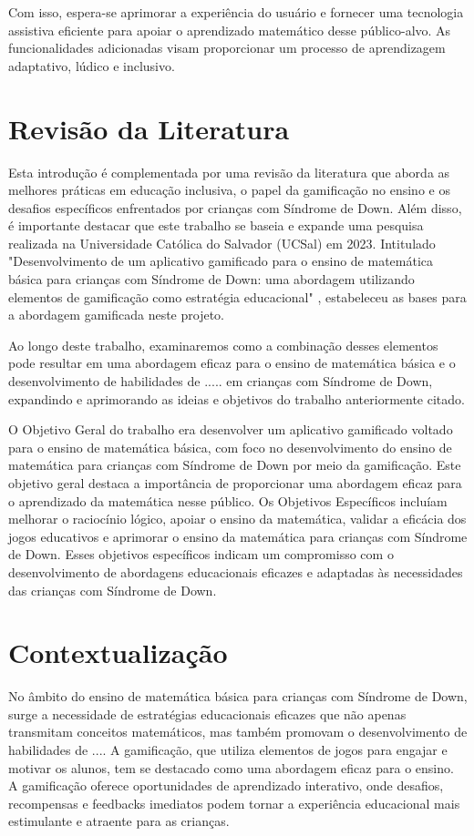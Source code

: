 Com isso, espera-se aprimorar a experiência do usuário e fornecer uma tecnologia assistiva eficiente para apoiar o aprendizado matemático desse público-alvo. As funcionalidades adicionadas visam proporcionar um processo de aprendizagem adaptativo, lúdico e inclusivo.

\section{Revisão da Literatura}

Esta introdução é complementada por uma revisão da literatura que aborda as melhores práticas em educação inclusiva, o papel da gamificação no ensino e os desafios específicos enfrentados por crianças com Síndrome de Down. Além disso, é importante destacar que este trabalho se baseia e expande uma pesquisa realizada na Universidade Católica do Salvador (UCSal) em 2023. Intitulado "Desenvolvimento de um aplicativo gamificado para o ensino de matemática básica para crianças com Síndrome de Down: uma abordagem utilizando elementos de gamificação como estratégia educacional" \cite{2023gamificacao}, estabeleceu as bases para a abordagem gamificada neste projeto. 

Ao longo deste trabalho, examinaremos como a combinação desses elementos pode resultar em uma abordagem eficaz para o ensino de matemática básica e o desenvolvimento de habilidades de ..... em crianças com Síndrome de Down, expandindo e aprimorando as ideias e objetivos do trabalho \cite{2023gamificacao} anteriormente citado. 

O Objetivo Geral do trabalho \cite{2023gamificacao} era desenvolver um aplicativo gamificado voltado para o ensino de matemática básica, com foco no desenvolvimento do ensino de matemática para crianças com Síndrome de Down por meio da gamificação. Este objetivo geral destaca a importância de proporcionar uma abordagem eficaz para o aprendizado da matemática nesse público. Os Objetivos Específicos incluíam melhorar o raciocínio lógico, apoiar o ensino da matemática, validar a eficácia dos jogos educativos e aprimorar o ensino da matemática para crianças com Síndrome de Down. Esses objetivos específicos indicam um compromisso com o desenvolvimento de abordagens educacionais eficazes e adaptadas às necessidades das crianças com Síndrome de Down.


\section{Contextualização}
No âmbito do ensino de matemática básica para crianças com Síndrome de Down, surge a necessidade de estratégias educacionais eficazes que não apenas transmitam conceitos matemáticos, mas também promovam o desenvolvimento de habilidades de .... A gamificação, que utiliza elementos de jogos para engajar e motivar os alunos, tem se destacado como uma abordagem eficaz para o ensino. A gamificação oferece oportunidades de aprendizado interativo, onde desafios, recompensas e feedbacks imediatos podem tornar a experiência educacional mais estimulante e atraente para as crianças.

